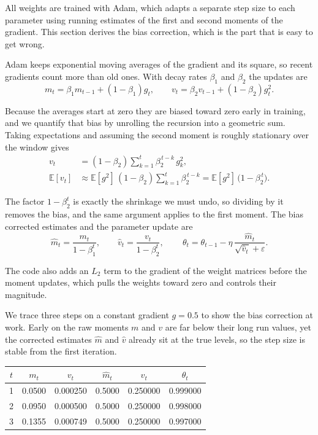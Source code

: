 \documentclass[12pt,letterpaper]{article}
\begin{document}
All weights are trained with Adam, which adapts a separate step size to each
parameter using running estimates of the first and second moments of the
gradient. This section derives the bias correction, which is the part that is
easy to get wrong.

Adam keeps exponential moving averages of the gradient and its square, so recent
gradients count more than old ones. With decay rates $\beta_1$ and $\beta_2$ the
updates are
\[
m_t = \beta_1 m_{t-1} + (1-\beta_1) g_t,
\qquad
v_t = \beta_2 v_{t-1} + (1-\beta_2) g_t^2 .
\]

Because the averages start at zero they are biased toward zero early in
training, and we quantify that bias by unrolling the recursion into a geometric
sum. Taking expectations and assuming the second moment is roughly stationary
over the window gives
\begin{align*}
v_t &= (1-\beta_2)\sum_{k=1}^{t} \beta_2^{\,t-k}\, g_k^2, \\
\mathbb{E}[v_t] &\approx \mathbb{E}[g^2]\,(1-\beta_2)\sum_{k=1}^{t}\beta_2^{\,t-k}
   = \mathbb{E}[g^2]\,\bigl(1 - \beta_2^{\,t}\bigr).
\end{align*}

The factor $1 - \beta_2^{t}$ is exactly the shrinkage we must undo, so dividing by
it removes the bias, and the same argument applies to the first moment. The bias
corrected estimates and the parameter update are
\[
\hat m_t = \frac{m_t}{1 - \beta_1^{t}},
\qquad
\hat v_t = \frac{v_t}{1 - \beta_2^{t}},
\qquad
\boxed{\,\theta_t = \theta_{t-1} - \eta\,\frac{\hat m_t}{\sqrt{\hat v_t} + \varepsilon}.}
\]

The code also adds an $L_2$ term to the gradient of the weight matrices before
the moment updates, which pulls the weights toward zero and controls their
magnitude.

We trace three steps on a constant gradient $g = 0.5$ to show the bias correction
at work. Early on the raw moments $m$ and $v$ are far below their long run
values, yet the corrected estimates $\hat m$ and $\hat v$ already sit at the true
levels, so the step size is stable from the first iteration.
\begin{center}
\begin{tabular}{cccccc}
\toprule
$t$ & $m_t$ & $v_t$ & $\hat m_t$ & $\hat v_t$ & $\theta_t$ \\
\midrule
1 & 0.0500 & 0.000250 & 0.5000 & 0.250000 & 0.999000 \\
2 & 0.0950 & 0.000500 & 0.5000 & 0.250000 & 0.998000 \\
3 & 0.1355 & 0.000749 & 0.5000 & 0.250000 & 0.997000 \\
\bottomrule
\end{tabular}
\end{center}
\end{document}
